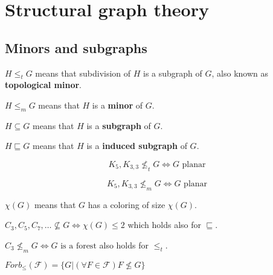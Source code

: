 \chapter{Structural graph theory}

\section{Minors and subgraphs}

\begin{defn}
	$H \leq_{t} G$ means that subdivision of $H$ is a subgraph of $G$, also known as \textbf{topological minor}.
\end{defn}

\begin{defn}
	$H \leq_{m} G$ means that $H$ is a \textbf{minor} of $G$.
\end{defn}

\begin{defn}
	$H \subseteq G$ means that $H$ is a \textbf{subgraph} of $G$.
\end{defn}

\begin{defn}
	$H \sqsubseteq G$ means that $H$ is a \textbf{induced subgraph} of $G$.
\end{defn}

\begin{thm}[Kuratowski]
	$$
	K_{5}, K_{3,3} \nleq_{t} G \Leftrightarrow G \text{ planar}
	$$
	
	$$
	K_{5}, K_{3,3} \nleq_{m} G \Leftrightarrow G \text{ planar}
	$$
\end{thm}

\begin{defn}
	$\chi(G)$ means that $G$ has a coloring of size $\chi(G)$.
\end{defn}

\begin{observ}
	$C_{3}, C_{5}, C_{7}, \dots \nsubseteq G \Leftrightarrow \chi(G) \leq 2$ which holds also for $\sqsubseteq$.
\end{observ}

\begin{observ}
	$C_{3} \nleq_{m} G \Leftrightarrow G \text{ is a forest}$ also holds for $\leq_{t}$.
\end{observ}

\begin{defn}
	$Forb_{\leq} (\mathcal{F}) = \{G | (\forall F \in \mathcal{F}) F \nleq G\}$
\end{defn}

